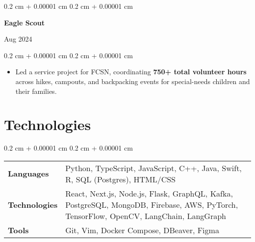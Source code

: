 \documentclass[10pt, letterpaper]{article}
\newenvironment{highlights}{
    \begin{itemize}[
        topsep=0.10 cm,
        parsep=0.10 cm,
        partopsep=0pt,
        itemsep=0pt,
        leftmargin=0.4 cm + 10pt
    ]
}{
    \end{itemize}
} %
\newenvironment{onecolentry}{
    \begin{adjustwidth}{
        0.2 cm + 0.00001 cm
    }{
        0.2 cm + 0.00001 cm
    }
}{
    \end{adjustwidth}
} %
\newenvironment{twocolentry}[2][]{
    \onecolentry
    \def\secondColumn{#2}
    \setcolumnwidth{\fill, 5 cm}
    \begin{paracol}{2}
}{
    \switchcolumn \raggedleft \secondColumn
    \end{paracol}
    \endonecolentry
} %
\begin{document}
        \begin{twocolentry}{
        Aug 2024}
            \textbf{Eagle Scout}
        \end{twocolentry}

        \vspace{0.10 cm}
        \begin{onecolentry}
            \begin{highlights}
                \item Led a service project for FCSN, coordinating \textbf{750+ total volunteer hours} across hikes, campouts, and backpacking events for special-needs children and their families.
            \end{highlights}
        \end{onecolentry}


    \section{Technologies}
    
        \begin{onecolentry}
            \begin{tabularx}{\textwidth}{@{}p{2.15cm}Y@{}}
                \textbf{Languages} & Python, TypeScript, JavaScript, C++, Java, Swift, R, SQL (Postgres), HTML/CSS \\[0.1cm]
                \textbf{Technologies} & React, Next.js, Node.js, Flask, GraphQL, Kafka, PostgreSQL, MongoDB, Firebase, AWS, PyTorch, TensorFlow, OpenCV, LangChain, LangGraph \\[0.5cm]
                \textbf{Tools} & Git, Vim, Docker Compose, DBeaver, Figma
            \end{tabularx}
        \end{onecolentry}
\end{document}
